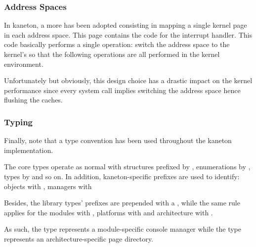 
\begin{frame}
  \frametitle{Address Spaces}

  In kaneton, a more  has been adopted consisting
  in mapping a single kernel page in each address space. This page contains
  the code for the interrupt handler. This code basically performs a single
  operation: switch the address space to the kernel's so that the following
  operations are all performed in the kernel environment.

  \-

  Unfortunately but obviously, this design choice has a drastic impact on
  the kernel performance since every system call implies switching the
  address space hence flushing the caches.
\end{frame}


\begin{frame}
  \frametitle{Typing}

  Finally, note that a type convention has been used throughout the
  kaneton implementation.

  \-

  The core types operate as normal with structures prefixed by ,
  enumerations by , types by  and so on. In addition,
  kaneton-specific prefixes are used to identify: objects with ,
  managers with  \etc{}

  \-

  Besides, the library types' prefixes are prepended with a ,
  while the same rule applies for the modules with , platforms
  with  and architecture with .

  \-

  As such, the type  represents a module-specific console
  manager while the type  represents an architecture-specific
  page directory.
\end{frame}


